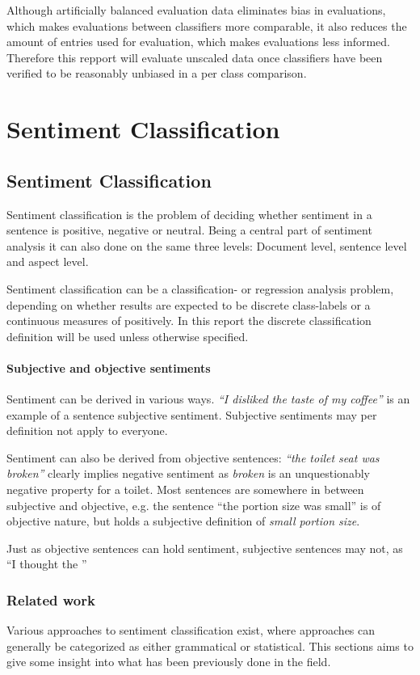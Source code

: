 \documentclass[a4paper,11pt]{kth-mag}
\begin{document}
Although artificially balanced evaluation data eliminates bias in evaluations, which makes evaluations between classifiers more comparable, it also reduces the amount of entries used for evaluation, which makes evaluations less informed. Therefore this repport will evaluate unscaled data once classifiers have been verified to be reasonably unbiased in a per class comparison.


\part{Sentiment Classification}
\chapter{Sentiment Classification}
Sentiment classification is the problem of deciding whether sentiment in a sentence is positive, negative or neutral\cite{nlp_book}. Being a central part of sentiment analysis it can also done on the same three levels: Document level, sentence level and aspect level.

Sentiment classification can be a classification- or regression analysis problem\cite{liu2012sentiment}, depending on whether results are expected to be discrete class-labels or a continuous measures of positively. In this report the discrete classification definition will be used unless otherwise specified.

\subsection{Subjective and objective sentiments}
Sentiment can be derived in various ways. \emph{``I disliked the taste of my coffee''} is an example of a sentence subjective sentiment. Subjective sentiments may per definition not apply to everyone.

Sentiment can also be derived from objective sentences: \emph{``the toilet seat was broken''} clearly implies negative sentiment as \emph{broken} is an unquestionably negative property for a toilet. Most sentences are somewhere in between subjective and objective, e.g. the sentence ``the portion size was small'' is of objective nature, but holds a subjective definition of \emph{small portion size}.

Just as objective sentences can hold sentiment, subjective sentences may not, as ``I thought the ''


\newpage
\section{Related work}
Various approaches to sentiment classification exist, where approaches can generally be categorized as either grammatical\cite{todo} or statistical\cite{todo}. This sections aims to give some insight into what has been previously done in the field.
\end{document}
